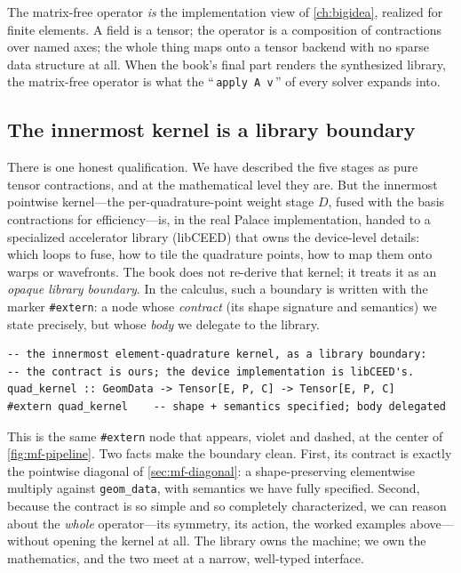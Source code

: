 \begin{keyidea}
The matrix-free operator \emph{is} the implementation view of \cref{ch:bigidea},
realized for finite elements. A field is a tensor; the operator is a composition
of contractions over named axes; the whole thing maps onto a tensor backend with
no sparse data structure at all. When the book's final part renders the
synthesized library, the matrix-free operator is what the
``\,\lstinline[style=l4style]|apply A v|\,'' of every solver expands into.
\end{keyidea}

\subsection{The innermost kernel is a library boundary}
\label{sec:mf-extern}

There is one honest qualification. We have described the five stages as pure
tensor contractions, and at the mathematical level they are. But the innermost
pointwise kernel---the per-quadrature-point weight stage $D$, fused with the basis
contractions for efficiency---is, in the real Palace implementation, handed to a
specialized accelerator library (libCEED) that owns the device-level details:
which loops to fuse, how to tile the quadrature points, how to map them onto warps
or wavefronts. The book does not re-derive that kernel; it treats it as an
\emph{opaque library boundary}. In the calculus, such a boundary is written with
the marker \lstinline[style=l4style]|#extern|: a node whose \emph{contract} (its
shape signature and semantics) we state precisely, but whose \emph{body} we
delegate to the library.

\begin{lstlisting}[style=l4style]
-- the innermost element-quadrature kernel, as a library boundary:
-- the contract is ours; the device implementation is libCEED's.
quad_kernel :: GeomData -> Tensor[E, P, C] -> Tensor[E, P, C]
#extern quad_kernel    -- shape + semantics specified; body delegated
\end{lstlisting}

\noindent This is the same \lstinline[style=l4style]|#extern| node that appears,
violet and dashed, at the center of \cref{fig:mf-pipeline}. Two facts make the
boundary clean. First, its contract is exactly the pointwise diagonal of
\cref{sec:mf-diagonal}: a shape-preserving elementwise multiply against
\texttt{geom\_data}, with semantics we have fully specified. Second, because the
contract is so simple and so completely characterized, we can reason about the
\emph{whole} operator---its symmetry, its action, the worked examples
above---without opening the kernel at all. The library owns the machine; we own
the mathematics, and the two meet at a narrow, well-typed interface.

